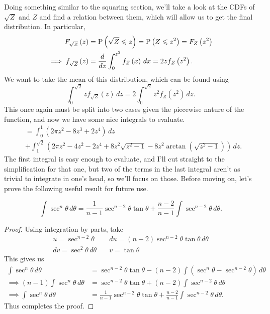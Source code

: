 Doing something similar to the squaring section, we'll take a look at the CDFs
of \( \sqrt{Z} \) and \( Z \) and find a relation between them, which will
allow us to get the final distribution. In particular, \MarginComment{}
\begin{align*}
    F_{\sqrt{Z}} \left( z \right) &= \operatorname{P} \left( \sqrt{Z} \leqslant z \right) = \operatorname{P} \left( Z \leqslant z^2 \right) = F_{Z} \left( z^2 \right) \\
    \implies f_{\sqrt{Z}} \left( z \right) &= \frac{d}{dz} \int_{0}^{z^2} f_Z \left( x \right) \, dx = 2z f_Z \left( z^2 \right)
.\end{align*}
We want to take the mean of this distribution, which can be found using
\[
    \int_{0}^{\sqrt{2}} z f_{\sqrt{Z}} \left( z \right) \, dz = 2 \int_{0}^{\sqrt{2}} z^2 f_Z \left( z^2 \right) \, dz
.\]
This once again must be split into two cases given the piecewise nature of the
function, and now we have some nice integrals to evaluate.
\begin{align*}
    &= \int_{0}^{1} \left( 2 \pi z^2 - 8z^3 + 2z^4 \right) \, dz \\
    &+ \int_{1}^{\sqrt{2}} \left( 2 \pi z^2 - 4z^2 - 2z^4 + 8z^2 \sqrt{z^2 - 1} - 8z^2 \arctan{\left( \sqrt{z^2 - 1} \right)} \right) \, dz
.\end{align*}
The first integral is easy enough to evaluate, and I'll cut straight to the
simplification for that one, but two of the terms in the last integral aren't
as trivial to integrate in one's head, so we'll focus on those. Before moving
on, let's prove the following useful result for future use.
\begin{lemma}
    \[
        \int \sec^n{\theta} \, d\theta = \frac{1}{n - 1} \sec^{n - 2}{\theta} \tan{\theta} + \frac{n - 2}{n - 1} \int \sec^{n-2}{\theta} \, d\theta
    .\]
\end{lemma}
\begin{proof}
    Using integration by parts, take
    \begin{align*}
        u = \sec^{n-2}{\theta} \quad &du = \left( n - 2 \right) \sec^{n-2}{\theta} \tan{\theta} \, d\theta \\
        dv = \sec^2{\theta} \, d\theta \quad &v = \tan{\theta}
    \end{align*}
    This gives us
    \begin{align*}
        \int \sec^n{\theta} \, d\theta &= \sec^{n-2}{\theta} \tan{\theta} - \left( n - 2 \right) \int \left( \sec^{n}{\theta} - \sec^{n-2}{\theta} \right) \, d\theta \\
        \implies \left( n - 1 \right) \int \sec^{n}{\theta} \, d\theta &= \sec^{n-2}{\theta} \tan{\theta} + \left( n - 2 \right) \int \sec^{n-2}{\theta} \, d\theta \\
        \implies \int \sec^{n}{\theta} \, d\theta &= \frac{1}{n - 1} \sec^{n-2}{\theta} \tan{\theta} + \frac{n - 2}{n - 1} \int \sec^{n-2}{\theta} \, d\theta
    .\end{align*}
    Thus completes the proof.
\end{proof}

